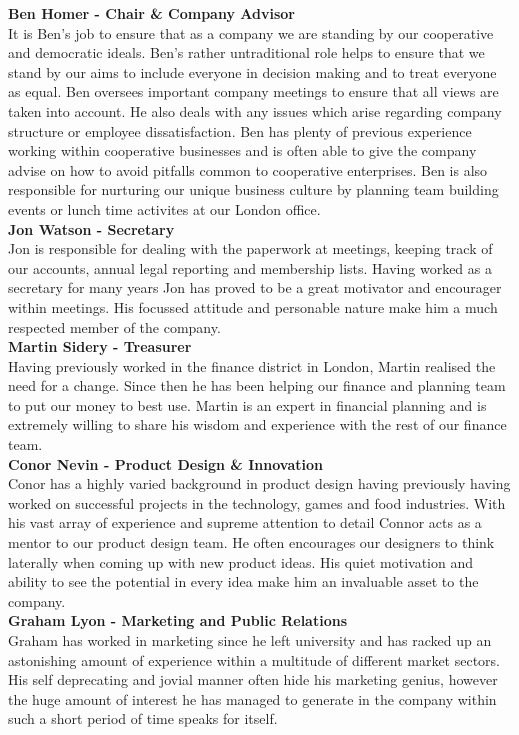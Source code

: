 \documentclass{article}
\begin{document}
  {\bf Ben Homer - Chair \& Company Advisor} \\
  It is Ben's job to ensure that as a company we are standing by our cooperative and democratic ideals. Ben's rather untraditional role helps to ensure that we stand by our aims to include everyone in decision making and to treat everyone as equal. Ben oversees important company meetings to ensure that all views are taken into account. He also deals with any issues which arise regarding company structure or employee dissatisfaction. Ben has plenty of previous experience working within cooperative businesses and is often able to give the company advise on how to avoid pitfalls common to cooperative enterprises. Ben is also responsible for nurturing our unique business culture by planning team building events or lunch time activites at our London office. \\
  
  {\bf Jon Watson - Secretary} \\
  Jon is responsible for dealing with the paperwork at meetings, keeping track of our accounts, annual legal reporting and membership lists. Having worked as a secretary for many years Jon has proved to be a great motivator and encourager within meetings. His focussed attitude and personable nature make him a much respected member of the company. \\

  {\bf Martin Sidery - Treasurer} \\
  Having previously worked in the finance district in London, Martin realised the need for a change. Since then he has been helping our finance and planning team to put our money to best use. Martin is an expert in financial planning and is extremely willing to share his wisdom and experience with the rest of our finance team. \\
 
  {\bf Conor Nevin - Product Design \& Innovation} \\
  Conor has a highly varied background in product design having previously having worked on successful projects in the technology, games and food industries. With his vast array of experience and supreme attention to detail Connor acts as a mentor to our product design team. He often encourages our designers to think laterally when coming up with new product ideas. His quiet motivation and ability to see the potential in every idea make him an invaluable asset to the company. \\

  {\bf Graham Lyon - Marketing and Public Relations} \\
  Graham has worked in marketing since he left university and has racked up an astonishing amount of experience within a multitude of different market sectors. His self deprecating and jovial manner often hide his marketing genius, however the huge amount of interest he has managed to generate in the company within such a short period of time speaks for itself.
\end{document}
